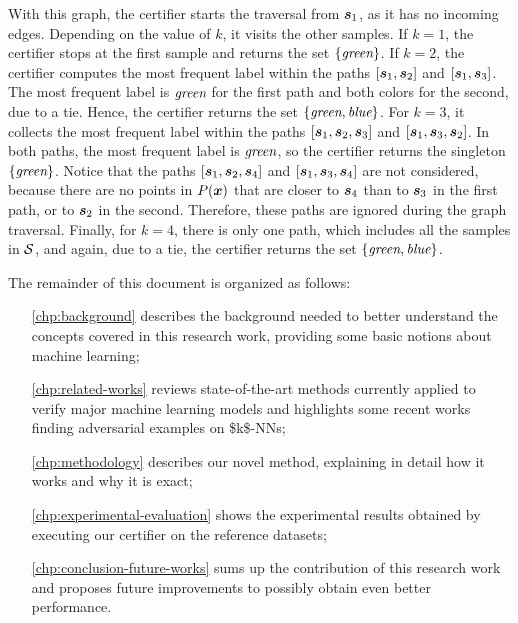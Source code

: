 With this graph, the certifier starts the traversal from $\sample[1]$, as it has no incoming edges. Depending on the value of $k$, it visits the other samples. If $k = 1$, the certifier stops at the first sample and returns the set $\{\emph{green}\}$. If $k = 2$, the certifier computes the most frequent label within the paths $[\sample[1], \sample[2]]$ and $[\sample[1], \sample[3]]$. The most frequent label is $\emph{green}$ for the first path and both colors for the second, due to a tie. Hence, the certifier returns the set $\{\emph{green}, \emph{blue}\}$. For $k = 3$, it collects the most frequent label within the paths $[\sample[1], \sample[2], \sample[3]]$ and $[\sample[1], \sample[3], \sample[2]]$. In both paths, the most frequent label is $\emph{green}$, so the certifier returns the singleton $\{\emph{green}\}$. Notice that the paths $[\sample[1], \sample[2], \sample[4]]$ and $[\sample[1], \sample[3], \sample[4]]$ are not considered, because there are no points in $P(\vinput)$ that are closer to $\sample[4]$ than to $\sample[3]$ in the first path, or to $\sample[2]$ in the second. Therefore, these paths are ignored during the graph traversal. Finally, for $k = 4$, there is only one path, which includes all the samples in $\set$, and again, due to a tie, the certifier returns the set $\{\emph{green}, \emph{blue}\}$.



\noindent The remainder of this document is organized as follows:
\begin{itemize}[leftmargin=	1.85cm]
	\item[\autoref{chp:background}] describes the background needed to better understand the concepts covered in this research work, providing some basic notions about machine learning;
	\item[\autoref{chp:related-works}] reviews state-of-the-art methods currently applied to verify major machine learning models and highlights some recent works finding adversarial examples on \acsp{$k$-NN};
	\item[\autoref{chp:methodology}] describes our novel method, explaining in detail how it works and why it is exact;
	\item[\autoref{chp:experimental-evaluation}] shows the experimental results obtained by executing our certifier on the reference datasets;
	\item[\autoref{chp:conclusion-future-works}] sums up the contribution of this research work and proposes future improvements to possibly obtain even better performance.
\end{itemize}